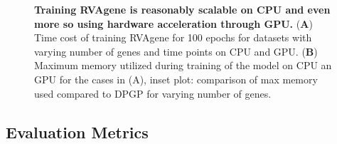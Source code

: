 \begin{center}
    \begin{figure}
        \caption[Computational cost of training RVAgene]{\textbf{Training RVAgene is reasonably scalable on CPU and even more so using hardware acceleration through GPU.} ({\bf A}) Time cost of training RVAgene for 100 epochs for datasets with varying number of genes and time points on CPU and GPU. ({\bf B}) Maximum memory utilized during training of the model on CPU an GPU for the cases in (A), inset plot: comparison of max memory used compared to DPGP for varying number of genes.}
  \label{fig:pdna2}
\end{figure}
\end{center}
\subsection{Evaluation Metrics}

